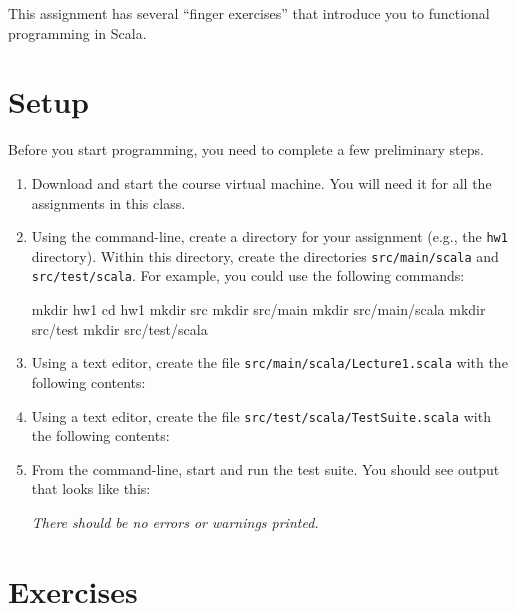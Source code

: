 \documentclass{book}
\begin{document}


This assignment has several ``finger exercises'' that introduce you
to functional programming in Scala.

\section{Setup}

Before you start programming, you need to complete a few preliminary steps.

\begin{enumerate}

\item Download and start the course virtual machine. You will need it for all
the assignments in this class.

\item Using the command-line, create a directory for your assignment (e.g., the
  \verb|hw1| directory). Within this directory, create the directories
  \verb|src/main/scala| and \verb|src/test/scala|. For example, you could use
  the following commands:
  \begin{console}
  mkdir hw1
  cd hw1
  mkdir src
  mkdir src/main
  mkdir src/main/scala
  mkdir src/test
  mkdir src/test/scala
  \end{console}

   \item Using a text editor, create the file \verb|src/main/scala/Lecture1.scala|
   with the following contents:

   \item Using a text editor, create the file \verb|src/test/scala/TestSuite.scala|
   with the following contents:

  \item From the command-line, start \sbt{} and run the test suite. You should
  see output that looks like this:

  

  \noindent \emph{There should be no errors or warnings printed.}

\end{enumerate}

\section{Exercises}
\end{document}
